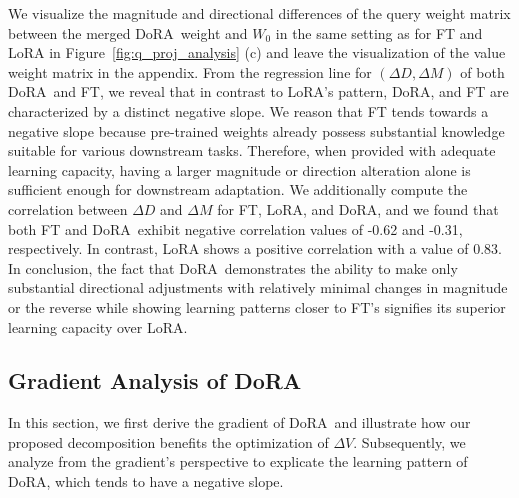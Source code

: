 \documentclass{article}
\newcommand{\ours}{DoRA}
\theoremstyle{plain}
\theoremstyle{definition}
\theoremstyle{remark}
\def\authornote#1#2#3{{\textcolor{#2}{\textsl{\small[#1: #3]}}}}
\newcommand{\PM}[1]{\authornote{Pavlo}{blue}{#1}}
\begin{document}
We visualize the magnitude and directional differences of the query weight matrix between the merged \ours~weight and $W_0$ in the same setting as for FT and LoRA in Figure~\ref{fig:q_proj_analysis} (c) and leave the visualization of the value weight matrix in the appendix. From the regression line for $(\Delta D, \Delta M)$ of both \ours~and FT, we reveal that in contrast to LoRA's pattern, \ours, and FT are characterized by a distinct negative slope. We reason that FT tends towards a negative slope because pre-trained weights already possess substantial knowledge suitable for various downstream tasks. Therefore, when provided with adequate learning capacity, having a larger magnitude or direction alteration alone is sufficient enough for downstream adaptation. We additionally compute the correlation between $\Delta D$ and $\Delta M$ for FT, LoRA, and \ours, and we found that both FT and \ours~exhibit negative correlation values of -0.62 and -0.31, respectively. In contrast, LoRA shows a positive correlation with a value of 0.83. In conclusion, the fact that \ours~demonstrates the ability to make only substantial directional adjustments with relatively minimal changes in magnitude or the reverse while showing learning patterns closer to FT's signifies its superior learning capacity over LoRA.






\subsection{Gradient Analysis of \ours}
\label{sec:gradient}
In this section, we first derive the gradient of \ours~and illustrate how our proposed decomposition benefits the optimization of $\Delta V$. Subsequently, we analyze from the gradient's perspective to explicate the learning pattern of \ours, which tends to have a negative slope. 
\end{document}

